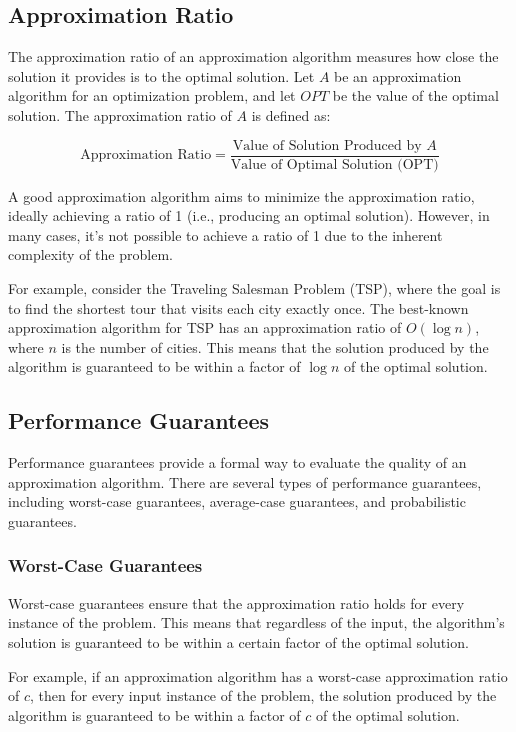 \documentclass[12pt]{book} %
\begin{document}
\subsection{Approximation Ratio}

The approximation ratio of an approximation algorithm measures how close the solution it provides is to the optimal solution. Let \(A\) be an approximation algorithm for an optimization problem, and let \(OPT\) be the value of the optimal solution. The approximation ratio of \(A\) is defined as:

\[
\text{Approximation Ratio} = \frac{\text{Value of Solution Produced by } A}{\text{Value of Optimal Solution (OPT)}}
\]

A good approximation algorithm aims to minimize the approximation ratio, ideally achieving a ratio of 1 (i.e., producing an optimal solution). However, in many cases, it's not possible to achieve a ratio of 1 due to the inherent complexity of the problem.

For example, consider the Traveling Salesman Problem (TSP), where the goal is to find the shortest tour that visits each city exactly once. The best-known approximation algorithm for TSP has an approximation ratio of \(O(\log n)\), where \(n\) is the number of cities. This means that the solution produced by the algorithm is guaranteed to be within a factor of \(\log n\) of the optimal solution.

\subsection{Performance Guarantees}

Performance guarantees provide a formal way to evaluate the quality of an approximation algorithm. There are several types of performance guarantees, including worst-case guarantees, average-case guarantees, and probabilistic guarantees.

\subsubsection{Worst-Case Guarantees}

Worst-case guarantees ensure that the approximation ratio holds for every instance of the problem. This means that regardless of the input, the algorithm's solution is guaranteed to be within a certain factor of the optimal solution.

For example, if an approximation algorithm has a worst-case approximation ratio of \(c\), then for every input instance of the problem, the solution produced by the algorithm is guaranteed to be within a factor of \(c\) of the optimal solution.
\end{document}
